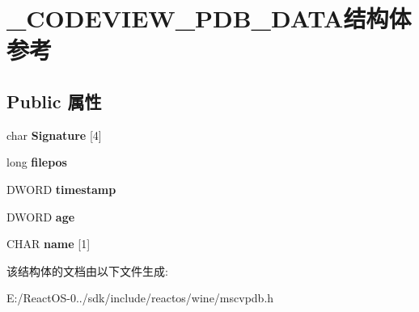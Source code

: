 \hypertarget{struct___c_o_d_e_v_i_e_w___p_d_b___d_a_t_a}{}\section{\+\_\+\+C\+O\+D\+E\+V\+I\+E\+W\+\_\+\+P\+D\+B\+\_\+\+D\+A\+T\+A结构体 参考}
\label{struct___c_o_d_e_v_i_e_w___p_d_b___d_a_t_a}
\subsection*{Public 属性}
\begin{DoxyCompactItemize}
\item 
\mbox{\label{struct___c_o_d_e_v_i_e_w___p_d_b___d_a_t_a_a37142655c9b9e6b9a1867b7580d309ab}} 
char {\bfseries Signature} \mbox{[}4\mbox{]}
\item 
\mbox{\label{struct___c_o_d_e_v_i_e_w___p_d_b___d_a_t_a_a711ab608d835e9ad73d33564f8f4e218}} 
long {\bfseries filepos}
\item 
\mbox{\label{struct___c_o_d_e_v_i_e_w___p_d_b___d_a_t_a_a3c6b28b9c839aa4c3eb6f6b72d27132b}} 
D\+W\+O\+RD {\bfseries timestamp}
\item 
\mbox{\label{struct___c_o_d_e_v_i_e_w___p_d_b___d_a_t_a_afeac751c5530d411cf0579ebc61e1721}} 
D\+W\+O\+RD {\bfseries age}
\item 
\mbox{\label{struct___c_o_d_e_v_i_e_w___p_d_b___d_a_t_a_a3b7d7c907d9cb687849d2890e9ee6a9d}} 
C\+H\+AR {\bfseries name} \mbox{[}1\mbox{]}
\end{DoxyCompactItemize}


该结构体的文档由以下文件生成\+:\begin{DoxyCompactItemize}
\item 
E\+:/\+React\+O\+S-\/0../sdk/include/reactos/wine/mscvpdb.\+h\end{DoxyCompactItemize}
